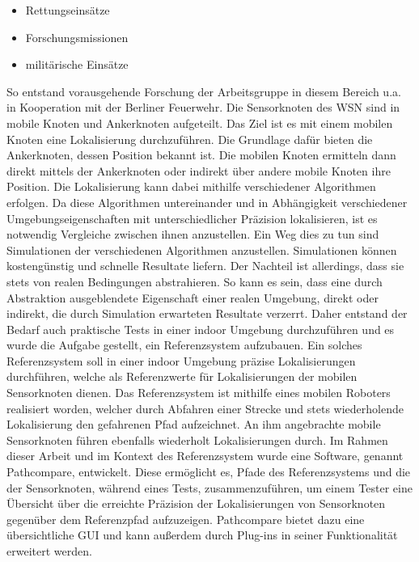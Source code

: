 \begin{itemize}
  \item Rettungseinsätze 
  \item Forschungsmissionen
  \item militärische Einsätze
\end{itemize}

So entstand vorausgehende Forschung der Arbeitsgruppe in diesem Bereich u.a. in
Kooperation mit der Berliner Feuerwehr. Die Sensorknoten des WSN sind in mobile
Knoten und Ankerknoten aufgeteilt. Das Ziel ist es mit einem mobilen Knoten
eine Lokalisierung durchzuführen. Die Grundlage dafür bieten die Ankerknoten,
dessen Position bekannt ist. Die mobilen Knoten ermitteln dann direkt mittels
der Ankerknoten oder indirekt über andere mobile Knoten ihre Position. Die
Lokalisierung kann dabei mithilfe verschiedener Algorithmen erfolgen. Da diese
Algorithmen untereinander und in Abhängigkeit verschiedener
Umgebungseigenschaften mit unterschiedlicher Präzision lokalisieren, ist es
notwendig Vergleiche zwischen ihnen anzustellen. Ein Weg dies zu tun sind
Simulationen der verschiedenen Algorithmen anzustellen. Simulationen können
kostengünstig und schnelle Resultate liefern. Der Nachteil ist allerdings, dass
sie stets von realen Bedingungen abstrahieren. So kann es sein, dass eine durch
Abstraktion ausgeblendete Eigenschaft einer realen Umgebung, direkt oder
indirekt, die durch Simulation erwarteten Resultate verzerrt. Daher entstand
der Bedarf auch praktische Tests in einer indoor Umgebung durchzuführen und es
wurde die Aufgabe gestellt, ein Referenzsystem aufzubauen. Ein solches
Referenzsystem soll in einer indoor Umgebung präzise Lokalisierungen
durchführen, welche als Referenzwerte für Lokalisierungen der mobilen
Sensorknoten dienen. Das Referenzsystem ist mithilfe eines mobilen Roboters
realisiert worden, welcher durch Abfahren einer Strecke und stets wiederholende
Lokalisierung den gefahrenen Pfad aufzeichnet.  An ihm angebrachte mobile
Sensorknoten führen ebenfalls wiederholt Lokalisierungen durch. Im Rahmen
dieser Arbeit und im Kontext des Referenzsystem wurde eine Software, genannt 
Pathcompare, entwickelt.  Diese ermöglicht es, Pfade des Referenzsystems und
die der Sensorknoten, während eines Tests, zusammenzuführen, um einem Tester
eine Übersicht über die erreichte Präzision der Lokalisierungen von
Sensorknoten gegenüber dem Referenzpfad aufzuzeigen. Pathcompare bietet dazu
eine übersichtliche GUI und kann außerdem durch Plug-ins in seiner Funktionalität
erweitert werden.

